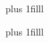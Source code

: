 \begin{frame}
  \vskip 0pt plus 1filll
  \raggedleft
  {\coverlinecourse\coursename\par}
  \vspace{\covercoursegap}
  {\coverlinetitle\inserttitle\par}
  \vspace{\covertitlegap}
  {\coverlinesubtitle\insertsubtitle\par}
  \vspace{\covermetagap}
  {\coverlineauthor\insertauthor\par}
  \vspace{\coverauthorgap}
  {\coverlinedegree\insertinstitute\par}
  \vskip 0pt plus 1filll
\end{frame}
